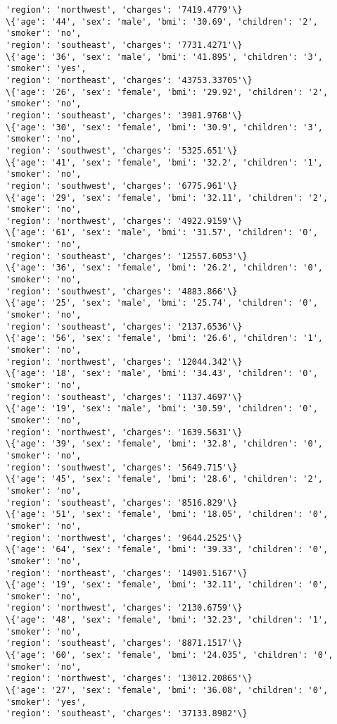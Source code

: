 \documentclass[11pt]{article}
\begin{document}
\begin{Verbatim}[commandchars=\\\{\}]
'region': 'northwest', 'charges': '7419.4779'\}
\{'age': '44', 'sex': 'male', 'bmi': '30.69', 'children': '2', 'smoker': 'no',
'region': 'southeast', 'charges': '7731.4271'\}
\{'age': '36', 'sex': 'male', 'bmi': '41.895', 'children': '3', 'smoker': 'yes',
'region': 'northeast', 'charges': '43753.33705'\}
\{'age': '26', 'sex': 'female', 'bmi': '29.92', 'children': '2', 'smoker': 'no',
'region': 'southeast', 'charges': '3981.9768'\}
\{'age': '30', 'sex': 'female', 'bmi': '30.9', 'children': '3', 'smoker': 'no',
'region': 'southwest', 'charges': '5325.651'\}
\{'age': '41', 'sex': 'female', 'bmi': '32.2', 'children': '1', 'smoker': 'no',
'region': 'southwest', 'charges': '6775.961'\}
\{'age': '29', 'sex': 'female', 'bmi': '32.11', 'children': '2', 'smoker': 'no',
'region': 'northwest', 'charges': '4922.9159'\}
\{'age': '61', 'sex': 'male', 'bmi': '31.57', 'children': '0', 'smoker': 'no',
'region': 'southeast', 'charges': '12557.6053'\}
\{'age': '36', 'sex': 'female', 'bmi': '26.2', 'children': '0', 'smoker': 'no',
'region': 'southwest', 'charges': '4883.866'\}
\{'age': '25', 'sex': 'male', 'bmi': '25.74', 'children': '0', 'smoker': 'no',
'region': 'southeast', 'charges': '2137.6536'\}
\{'age': '56', 'sex': 'female', 'bmi': '26.6', 'children': '1', 'smoker': 'no',
'region': 'northwest', 'charges': '12044.342'\}
\{'age': '18', 'sex': 'male', 'bmi': '34.43', 'children': '0', 'smoker': 'no',
'region': 'southeast', 'charges': '1137.4697'\}
\{'age': '19', 'sex': 'male', 'bmi': '30.59', 'children': '0', 'smoker': 'no',
'region': 'northwest', 'charges': '1639.5631'\}
\{'age': '39', 'sex': 'female', 'bmi': '32.8', 'children': '0', 'smoker': 'no',
'region': 'southwest', 'charges': '5649.715'\}
\{'age': '45', 'sex': 'female', 'bmi': '28.6', 'children': '2', 'smoker': 'no',
'region': 'southeast', 'charges': '8516.829'\}
\{'age': '51', 'sex': 'female', 'bmi': '18.05', 'children': '0', 'smoker': 'no',
'region': 'northwest', 'charges': '9644.2525'\}
\{'age': '64', 'sex': 'female', 'bmi': '39.33', 'children': '0', 'smoker': 'no',
'region': 'northeast', 'charges': '14901.5167'\}
\{'age': '19', 'sex': 'female', 'bmi': '32.11', 'children': '0', 'smoker': 'no',
'region': 'northwest', 'charges': '2130.6759'\}
\{'age': '48', 'sex': 'female', 'bmi': '32.23', 'children': '1', 'smoker': 'no',
'region': 'southeast', 'charges': '8871.1517'\}
\{'age': '60', 'sex': 'female', 'bmi': '24.035', 'children': '0', 'smoker': 'no',
'region': 'northwest', 'charges': '13012.20865'\}
\{'age': '27', 'sex': 'female', 'bmi': '36.08', 'children': '0', 'smoker': 'yes',
'region': 'southeast', 'charges': '37133.8982'\}

\end{Verbatim}
\end{document}
